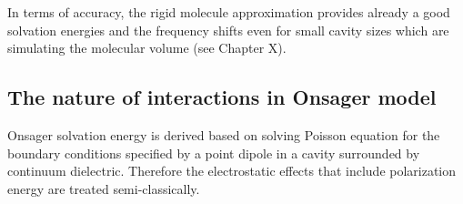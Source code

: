 \documentclass[a4paper,titlepage,twoside,fleqn,12pt]{book}
\begin{document}
\begin{refsection}
In terms of accuracy, the rigid molecule approximation
provides already a good solvation energies and the frequency shifts
even for small cavity sizes which are simulating the molecular
volume
(see Chapter X). 

\subsection{The nature of interactions in Onsager model}

Onsager solvation energy is derived based on solving Poisson
equation for the boundary conditions specified by a point
dipole in a cavity surrounded by continuum dielectric.
Therefore the electrostatic effects that include polarization
energy are treated semi\hyp{}classically.


\end{refsection}
\end{document}
